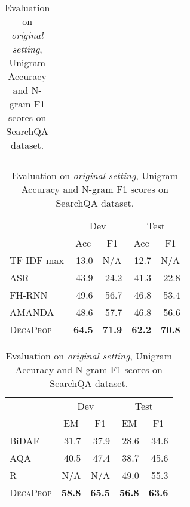 \documentclass{article}
\begin{document}
\begin{table}[t]
\begin{minipage}[t]{.46\linewidth}
\begin{tabular}{lcccc}
    \end{tabular}

    \caption{Performance comparison on Quasar-T dataset. }
\label{quasar}\end{minipage}




\centering
    \begin{minipage}[t]{.46\linewidth}
    \centering
        \begin{tabular}{lrrrr}
        \hline
          & \multicolumn{2}{c}{Dev} & \multicolumn{2}{c}{Test} \\
            \cline{2-5}
          & \multicolumn{1}{c}{Acc} & \multicolumn{1}{c}{F1} & \multicolumn{1}{c}{Acc} & \multicolumn{1}{c}{F1} \\
          \hline
    TF-IDF max & 13.0    & \multicolumn{1}{l}{N/A} & 12.7  & \multicolumn{1}{l}{N/A} \\
    ASR   & 43.9  & 24.2  & 41.3  & 22.8 \\
    FH-RNN &  49.6 & 56.7 & 46.8 &53.4\\
    AMANDA & 48.6  & 57.7  & 46.8  & 56.6 \\
    \hline
    \textsc{DecaProp} & \textbf{64.5}  & \textbf{71.9}  & \textbf{62.2}  & \textbf{70.8} \\
    \hline

    \end{tabular}

      \caption{Evaluation on \textit{original setting}, Unigram Accuracy and N-gram F1 scores on SearchQA dataset.}
        \label{searchqa1}
    \end{minipage}\hfill
    \begin{minipage}[t]{.46\linewidth}
\centering

    \begin{tabular}{lrrrr}

    \hline
          & \multicolumn{2}{c}{Dev} & \multicolumn{2}{c}{Test} \\
          \cline{2-5}
          & \multicolumn{1}{c}{EM} & \multicolumn{1}{c}{F1} & \multicolumn{1}{c}{EM} & \multicolumn{1}{c}{F1} \\
          \hline
    BiDAF & 31.7  & 37.9  & 28.6  & 34.6 \\
    AQA   & 40.5  & 47.4  & 38.7  & 45.6 \\
    R  & N/A      & N/A       & 49.0    & 55.3 \\
    \hline
    \textsc{DecaProp} & \textbf{58.8}  & \textbf{65.5}  & \textbf{56.8}  & \textbf{63.6} \\
    \hline


\end{tabular}
\end{minipage}
\end{table}
\end{document}
